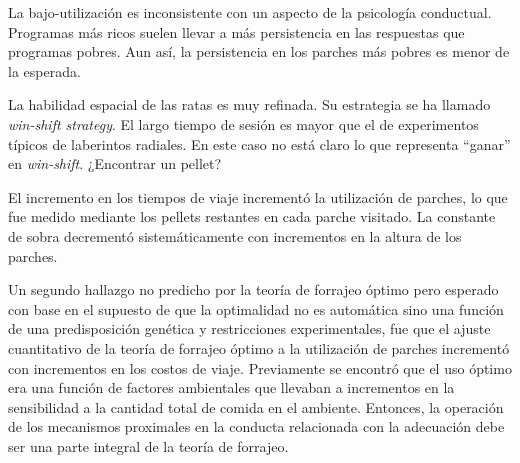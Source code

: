 \documentclass[a4paper,12pt]{article}
\begin{document}
La bajo-utilización es inconsistente con un aspecto de la psicología conductual. Programas más ricos suelen llevar a más persistencia en las respuestas que programas pobres. Aun así, la persistencia en los parches más pobres es menor de la esperada.

La habilidad espacial de las ratas es muy refinada. Su estrategia se ha llamado {\itshape win-shift strategy}. El largo tiempo de sesión es mayor que el de experimentos típicos de laberintos radiales. En este caso no está claro lo que representa ``ganar'' en {\itshape win-shift}. ¿Encontrar un pellet?

El incremento en los tiempos de viaje incrementó la utilización de parches, lo que fue medido mediante los pellets restantes en cada parche visitado. La constante de sobra decrementó sistemáticamente con incrementos en la altura de los parches.

Un segundo hallazgo no predicho por la teoría de forrajeo óptimo pero esperado con base en el supuesto de que la optimalidad no es automática sino una función de una predisposición genética y restricciones experimentales, fue que el ajuste cuantitativo de la teoría de forrajeo óptimo a la utilización de parches incrementó con incrementos en los costos de viaje. Previamente se encontró que el uso óptimo era una función de factores ambientales que llevaban a incrementos en la sensibilidad a la cantidad total de comida en el ambiente. Entonces, la operación de los mecanismos proximales en la conducta relacionada con la adecuación debe ser una parte integral de la teoría de forrajeo.
\end{document}
